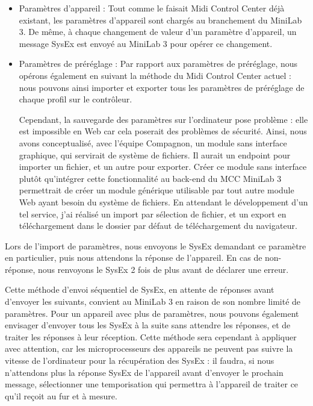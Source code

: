 \documentclass[francais]{rapportPFE}  %
\begin{document}
\begin{itemize}
    \item Paramètres d'appareil :  Tout comme le faisait Midi Control Center déjà existant, les paramètres d'appareil sont chargés au branchement du MiniLab 3. De même, à chaque changement de valeur d'un paramètre d'appareil, un message SysEx est envoyé au MiniLab 3 pour opérer ce changement.
    \item Paramètres de préréglage : Par rapport aux paramètres de préréglage, nous opérons également en suivant la méthode du Midi Control Center actuel : nous pouvons ainsi importer et exporter tous les paramètres de préréglage de chaque profil sur le contrôleur. 
    
    Cependant, la sauvegarde des paramètres sur l'ordinateur pose problème : elle est impossible en Web car cela poserait des problèmes de sécurité. Ainsi, nous avons conceptualisé, avec l'équipe Compagnon, un module sans interface graphique, qui servirait de système de fichiers. Il aurait un endpoint pour importer un fichier, et un autre pour exporter. Créer ce module sans interface plutôt qu'intégrer cette fonctionnalité au back-end du MCC MiniLab 3 permettrait de créer un module générique utilisable par tout autre module Web ayant besoin du système de fichiers. En attendant le développement d'un tel service, j'ai réalisé un import par sélection de fichier, et un export en téléchargement dans le dossier par défaut de téléchargement du navigateur.
\end{itemize}

Lors de l'import de paramètres, nous envoyons le SysEx demandant ce paramètre en particulier, puis nous attendons la réponse de l'appareil. En cas de non-réponse, nous renvoyons le SysEx 2 fois de plus avant de déclarer une erreur.

Cette méthode d'envoi séquentiel de SysEx, en attente de réponses avant d'envoyer les suivants, convient au MiniLab 3 en raison de son nombre limité de paramètres. Pour un appareil avec plus de paramètres, nous pouvons également envisager d'envoyer tous les SysEx à la suite sans attendre les réponses, et de traiter les réponses à leur réception. Cette méthode sera cependant à appliquer avec attention, car les microprocesseurs des appareils ne peuvent pas suivre la vitesse de l'ordinateur pour la récupération des SysEx : il faudra, si nous n'attendons plus la réponse SysEx de l'appareil avant d'envoyer le prochain message, sélectionner une temporisation qui permettra à l'appareil de traiter ce qu'il reçoit au fur et à mesure.
\end{document}
